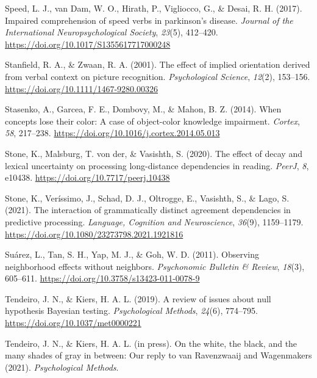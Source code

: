 \documentclass[
  12pt,
  man,floatsintext]{apa7}
\newlength{\cslhangindent}
\newlength{\cslentryspacingunit} %
\newenvironment{CSLReferences}[2] %
 {%
  \setlength{\parindent}{0pt}
  \ifodd #1
  \let\oldpar\par
  \def\par{\hangindent=\cslhangindent\oldpar}
  \fi
  \setlength{\parskip}{#2\cslentryspacingunit}
 }%
 {}
\begin{document}
\begin{CSLReferences}{1}{0}
\leavevmode{}%
Speed, L. J., van Dam, W. O., Hirath, P., Vigliocco, G., \& Desai, R. H. (2017). Impaired comprehension of speed verbs in parkinson's disease. \emph{Journal of the International Neuropsychological Society}, \emph{23}(5), 412--420. \url{https://doi.org/10.1017/S1355617717000248}

\leavevmode{}%
Stanfield, R. A., \& Zwaan, R. A. (2001). The effect of implied orientation derived from verbal context on picture recognition. \emph{Psychological Science}, \emph{12}(2), 153--156. \url{https://doi.org/10.1111/1467-9280.00326}

\leavevmode{}%
Stasenko, A., Garcea, F. E., Dombovy, M., \& Mahon, B. Z. (2014). When concepts lose their color: {A} case of object-color knowledge impairment. \emph{Cortex}, \emph{58}, 217--238. \url{https://doi.org/10.1016/j.cortex.2014.05.013}

\leavevmode{}%
Stone, K., Malsburg, T. von der, \& Vasishth, S. (2020). The effect of decay and lexical uncertainty on processing long-distance dependencies in reading. \emph{PeerJ}, \emph{8}, e10438. \url{https://doi.org/10.7717/peerj.10438}

\leavevmode{}%
Stone, K., Veríssimo, J., Schad, D. J., Oltrogge, E., Vasishth, S., \& Lago, S. (2021). The interaction of grammatically distinct agreement dependencies in predictive processing. \emph{Language, Cognition and Neuroscience}, \emph{36}(9), 1159--1179. \url{https://doi.org/10.1080/23273798.2021.1921816}

\leavevmode{}%
Suárez, L., Tan, S. H., Yap, M. J., \& Goh, W. D. (2011). Observing neighborhood effects without neighbors. \emph{Psychonomic Bulletin \& Review}, \emph{18}(3), 605--611. \url{https://doi.org/10.3758/s13423-011-0078-9}

\leavevmode{}%
Tendeiro, J. N., \& Kiers, H. A. L. (2019). A review of issues about null hypothesis {Bayesian} testing. \emph{Psychological Methods}, \emph{24}(6), 774--795. \url{https://doi.org/10.1037/met0000221}

\leavevmode{}%
Tendeiro, J. N., \& Kiers, H. A. L. (in press). On the white, the black, and the many shades of gray in between: {Our} reply to van {Ravenzwaaij} and {Wagenmakers} (2021). \emph{Psychological Methods}.


\end{CSLReferences}
\end{document}
